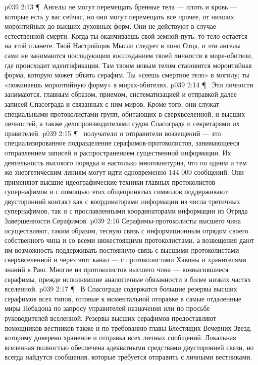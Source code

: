 \vs p039 2:13 \P\ Ангелы не могут перемещать бренные тела --- плоть и кровь --- которые есть у вас сейчас, но они могут перемещать все прочее, от низших моронтийных до высших духовных форм. Они не действуют в случае естественной смерти. Когда ты оканчиваешь свой земной путь, то тело остается на этой планете. Твой Настройщик Мысли следует в лоно Отца, и эти ангелы сами не занимаются последующим воссозданием твоей личности в мире\hyp{}обители, где происходит идентификация. Там твоим новым телом становится моронтийная форма, которую может объять серафим. Ты «сеешь смертное тело» в могилу; ты «пожинаешь моронтийную форму» в мирах\hyp{}обителях.
\vs p039 2:14 \P\ \bibnobreakspace {} Эти личности занимаются, главным образом, приемом, систематизацией и отправкой далее записей Спасограда и связанных с ним миров. Кроме того, они служат специальными протоколистами групп, обитающих в сверхвселенной, и высших личностей, а также делопроизводителями судов Спасограда и секретарями их правителей.
\vs p039 2:15 \P\  получатели и отправители возвещений --- это специализированное подразделение серафимов\hyp{}протоколистов, занимающееся отправлением записей и распространением существенной информации. Их деятельность высокого порядка и настолько многоконтурна, что по одним и тем же энергетическим линиям могут идти одновременно 144 000 сообщений. Они применяют высшие идеографические техники главных протоколистов\hyp{}супернафимов и с помощью этих общепринятых символов поддерживают двусторонний контакт как с координаторами информации из числа третичных супернафимов, так и с прославленными координаторами информации из Отряда Завершенности Серафимов.
\vs p039 2:16 Серафимы\hyp{}протоколисты высшего чина осуществляют, таким образом, тесную связь с информационным отрядом своего собственного чина и со всеми нижестоящими протоколистами, а возвещения дают им возможность поддерживать постоянную связь с высшими протоколистами сверхвселенной и через этот канал --- с протоколистами Хавоны и хранителями знаний в Раю. Многие из протоколистов высшего чина --- возвысившиеся серафимы, прежде исполнявшие аналогичные обязанности в более низких частях вселенной.
\vs p039 2:17 \P\ \bibnobreakspace {} В Спасограде содержатся большие резервы высших серафимов всех типов, готовые к моментальной отправке в самые отдаленные миры Небадона по запросу управителей назначения или по просьбе руководителей вселенной. Резервы высших серафимов предоставляют помощников\hyp{}вестников также и по требованию главы Блестящих Вечерних Звезд, которому доверено хранение и отправка всех личных сообщений. Локальная вселенная полностью обеспечена адекватными средствами двусторонней связи, но всегда найдутся сообщения, которые требуется отправить с личными вестниками.

